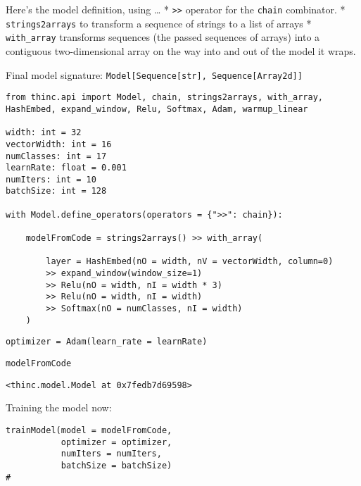 \documentclass[
]{article}
\begin{document}
Here's the model definition, using \ldots{} * \texttt{>>}
operator for the \texttt{chain} combinator. *
\texttt{strings2arrays} to transform a sequence of strings
to a list of arrays * \texttt{with_array} transforms
sequences (the passed sequences of arrays) into a contiguous
two-dimensional array on the way into and out of the model it wraps.

Final model signature:
\texttt{Model[Sequence[str], Sequence[Array2d]]}

\begin{verbatim}
from thinc.api import Model, chain, strings2arrays, with_array, HashEmbed, expand_window, Relu, Softmax, Adam, warmup_linear

width: int = 32
vectorWidth: int = 16
numClasses: int = 17
learnRate: float = 0.001
numIters: int = 10
batchSize: int = 128

with Model.define_operators(operators = {">>": chain}):

    modelFromCode = strings2arrays() >> with_array(

        layer = HashEmbed(nO = width, nV = vectorWidth, column=0)
        >> expand_window(window_size=1)
        >> Relu(nO = width, nI = width * 3)
        >> Relu(nO = width, nI = width)
        >> Softmax(nO = numClasses, nI = width)
    )
\end{verbatim}

\begin{verbatim}
optimizer = Adam(learn_rate = learnRate)
\end{verbatim}

\begin{verbatim}
modelFromCode
\end{verbatim}

\begin{verbatim}
<thinc.model.Model at 0x7fedb7d69598>
\end{verbatim}

Training the model now:

\begin{verbatim}
trainModel(model = modelFromCode,
           optimizer = optimizer,
           numIters = numIters,
           batchSize = batchSize)
#
\end{verbatim}
\end{document}
